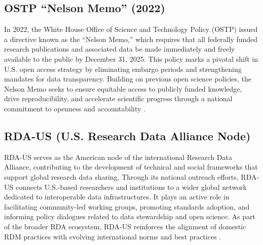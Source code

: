 \subsection{OSTP “Nelson Memo” (2022)}

In 2022, the White House Office of Science and Technology Policy (OSTP) issued a directive known as the “Nelson Memo,” which requires that all federally funded research publications and associated data be made immediately and freely available to the public by December 31, 2025. This policy marks a pivotal shift in U.S. open access strategy by eliminating embargo periods and strengthening mandates for data transparency. Building on previous open science policies, the Nelson Memo seeks to ensure equitable access to publicly funded knowledge, drive reproducibility, and accelerate scientific progress through a national commitment to openness and accountability \cite{ostp_nelson}.

\subsection{RDA-US (U.S. Research Data Alliance Node)}

RDA-US serves as the American node of the international Research Data Alliance, contributing to the development of technical and social frameworks that support global research data sharing. Through its national outreach efforts, RDA-US connects U.S.-based researchers and institutions to a wider global network dedicated to interoperable data infrastructures. It plays an active role in facilitating community-led working groups, promoting standards adoption, and informing policy dialogues related to data stewardship and open science. As part of the broader RDA ecosystem, RDA-US reinforces the alignment of domestic RDM practices with evolving international norms and best practices \cite{rda_us}.


